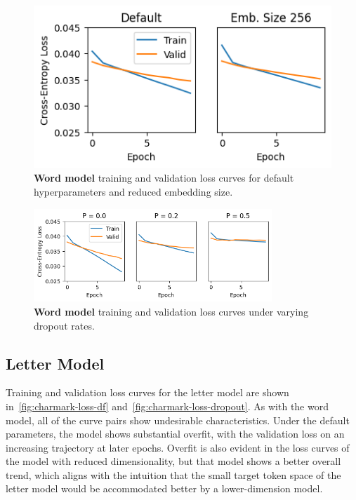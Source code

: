 \documentclass[letterpaper]{article} %
\begin{document}
\begin{NoHyper}
\begin{figure}
\centering
\includegraphics[width=0.9\columnwidth]{fig-onemark-loss-default-and-embsize}
\caption{\textbf{Word model} training and validation loss curves for default hyperparameters and reduced embedding size.}
\label{fig:onemark-loss-df}
\end{figure}

\begin{figure}
\centering
\includegraphics[width=0.8\textwidth]{fig-onemark-loss-dropout}
\caption{\textbf{Word model} training and validation loss curves under varying dropout rates.}
\label{fig:onemark-loss-dropout}
\end{figure}

\subsection{Letter Model}
\label{subsec:letter}

Training and validation loss curves for the letter model are shown in~\ref{fig:charmark-loss-df} and~\ref{fig:charmark-loss-dropout}.
As with the word model, all of the curve pairs show undesirable characteristics.
Under the default parameters, the model shows substantial overfit, with the validation loss on an increasing trajectory at later epochs.
Overfit is also evident in the loss curves of the model with reduced dimensionality, but that model shows a better overall trend, which aligns with the intuition that the small target token space of the letter model would be accommodated better by a lower-dimension model.


\end{NoHyper}
\end{document}
